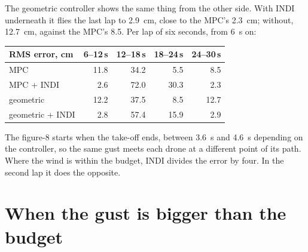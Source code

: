 The geometric controller shows the same thing from the other side. With INDI underneath it flies the last lap to \SI{2.9}{cm}, close to the MPC's \SI{2.3}{cm}; without, \SI{12.7}{cm}, against the MPC's 8.5. Per lap of six seconds, from \SI{6}{s} on:

\begin{center}\sffamily\small
\begin{tabular}{lrrrr}
  RMS error, cm & 6--12\,s & 12--18\,s & 18--24\,s & 24--30\,s\\\hline
  MPC & 11.8 & 34.2 & 5.5 & 8.5\\
  MPC + INDI & 2.6 & 72.0 & 30.3 & 2.3\\
  geometric & 12.2 & 37.5 & 8.5 & 12.7\\
  geometric + INDI & 2.8 & 57.4 & 15.9 & 2.9\\
\end{tabular}
\end{center}
The figure-8 starts when the take-off ends, between \SI{3.6}{s} and \SI{4.6}{s} depending on the controller, so the same gust meets each drone at a different point of its path. Where the wind is within the budget, INDI divides the error by four. In the second lap it does the opposite.

\section{When the gust is bigger than the budget}

